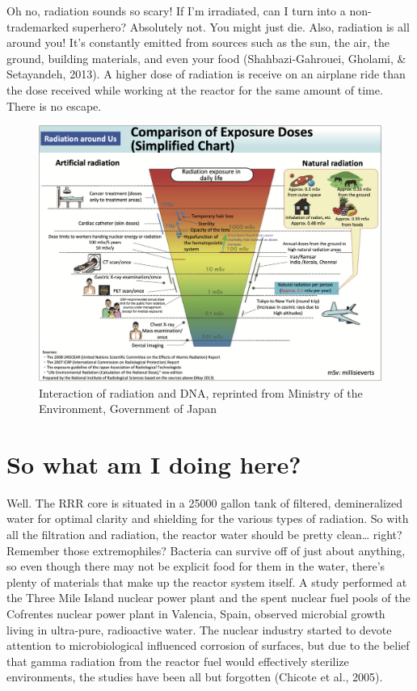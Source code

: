 \documentclass[12pt,twoside]{reedthesis}
\begin{document}
Oh no, radiation sounds so scary! If I'm irradiated, can I turn into a non-trademarked superhero? Absolutely not. You might just die. Also, radiation is all around you! It's constantly emitted from sources such as the sun, the air, the ground, building materials, and even your food (Shahbazi-Gahrouei, Gholami, \& Setayandeh, 2013). A higher dose of radiation is receive on an airplane ride than the dose received while working at the reactor for the same amount of time. There is no escape.
\begin{figure}

{\centering \includegraphics[width=1\linewidth]{figure/daily radiation} 

}

\caption{Interaction of radiation and DNA, reprinted from Ministry of the Environment, Government of Japan}\label{fig:dailyRadiation}
\end{figure}
\hypertarget{so-what-am-i-doing-here}{%
\section{So what am I doing here?}\label{so-what-am-i-doing-here}}

Well. The RRR core is situated in a 25000 gallon tank of filtered, demineralized water for optimal clarity and shielding for the various types of radiation. So with all the filtration and radiation, the reactor water should be pretty clean\ldots{} right?
Remember those extremophiles? Bacteria can survive off of just about anything, so even though there may not be explicit food for them in the water, there's plenty of materials that make up the reactor system itself. A study performed at the Three Mile Island nuclear power plant and the spent nuclear fuel pools of the Cofrentes nuclear power plant in Valencia, Spain, observed microbial growth living in ultra-pure, radioactive water. The nuclear industry started to devote attention to microbiological influenced corrosion of surfaces, but due to the belief that gamma radiation from the reactor fuel would effectively sterilize environments, the studies have been all but forgotten (Chicote et al., 2005).
\end{document}
